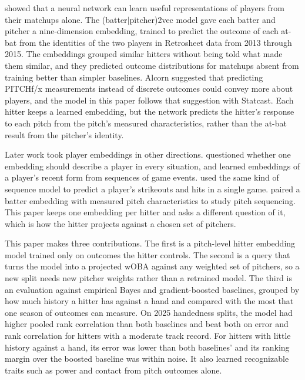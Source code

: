 \documentclass[11pt,letterpaper]{article}
\begin{document}
\citet{alcorn2018} showed that a neural network can learn useful representations of players from their matchups alone. The (batter$|$pitcher)2vec model gave each batter and pitcher a nine-dimension embedding, trained to predict the outcome of each at-bat from the identities of the two players in Retrosheet data from 2013 through 2015. The embeddings grouped similar hitters without being told what made them similar, and they predicted outcome distributions for matchups absent from training better than simpler baselines. Alcorn suggested that predicting PITCHf/x measurements instead of discrete outcomes could convey more about players, and the model in this paper follows that suggestion with Statcast. Each hitter keeps a learned embedding, but the network predicts the hitter's response to each pitch from the pitch's measured characteristics, rather than the at-bat result from the pitcher's identity.

Later work took player embeddings in other directions. \citet{heaton2022} questioned whether one embedding should describe a player in every situation, and learned embeddings of a player's recent form from sequences of game events. \citet{heaton2023} used the same kind of sequence model to predict a player's strikeouts and hits in a single game. \citet{melville2023} paired a batter embedding with measured pitch characteristics to study pitch sequencing. This paper keeps one embedding per hitter and asks a different question of it, which is how the hitter projects against a chosen set of pitchers.

This paper makes three contributions. The first is a pitch-level hitter embedding model trained only on outcomes the hitter controls. The second is a query that turns the model into a projected wOBA against any weighted set of pitchers, so a new split needs new pitcher weights rather than a retrained model. The third is an evaluation against empirical Bayes and gradient-boosted baselines, grouped by how much history a hitter has against a hand and compared with the most that one season of outcomes can measure. On 2025 handedness splits, the model had higher pooled rank correlation than both baselines and beat both on error and rank correlation for hitters with a moderate track record. For hitters with little history against a hand, its error was lower than both baselines' and its ranking margin over the boosted baseline was within noise. It also learned recognizable traits such as power and contact from pitch outcomes alone.

\end{document}
